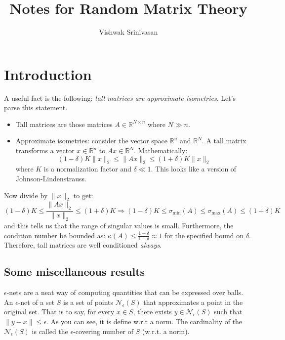 \documentclass{article}
\title{Notes for Random Matrix Theory}
\author{Vishwak Srinivasan}
\date{}
\theoremstyle{remark}
\newcommand{\real}{\mathbb{R}}
\newcommand{\calN}{\mathcal{N}}
\begin{document}
\raggedright

\maketitle
\tableofcontents

\newpage

\section{Introduction}
A useful fact is the following: \emph{tall matrices are approximate isometries}. Let's parse this statement.
\begin{itemize}
\item Tall matrices are those matrices \(A \in \real^{N \times n}\) where \(N \gg n\).
\item Approximate isometries: consider the vector space \(\real^{n}\) and \(\real^{N}\). A tall matrix transforms a vector \(x \in \real^{n}\) to \(Ax \in \real^{N}\). Mathematically:
\begin{equation*}
(1 - \delta)K\|x\|_{2} \leq \|Ax\|_{2} \leq (1 + \delta)K\|x\|_{2}
\end{equation*}
where \(K\) is a normalization factor and \(\delta \ll 1\).
This looks like a version of Johnson-Lindenstrauss.
\end{itemize}

Now divide by \(\|x\|_{2}\) to get:
\begin{equation*}
(1 - \delta)K \leq \frac{\|Ax\|_{2}}{\|x\|_{2}} \leq (1 + \delta)K \Rightarrow (1 - \delta)K \leq \sigma_{\min}(A) \leq \sigma_{\max}(A) \leq (1 + \delta)K
\end{equation*}
and this tells us that the range of singular values is small. Furthermore, the condition number be bounded as: \(\kappa(A) \leq \frac{1 + \delta}{1 - \delta} \approx 1\) for the specified bound on \(\delta\). Therefore, tall matrices are well conditioned \emph{always}.

\subsection{Some miscellaneous results}
\(\epsilon\)-nets are a neat way of computing quantities that can be expressed over balls.
An \(\epsilon\)-net of a set \(S\) is a set of points \(\calN_{\epsilon}(S)\) that approximates a point in the original set.
That is to say, for every \(x \in S\), there exists \(y \in \calN_{\epsilon}(S)\) such that \(\|y - x\| \leq \epsilon\).
As you can see, it is define w.r.t a norm. The cardinality of the \(\calN_{\epsilon}(S)\) is called the \(\epsilon\)-covering number of \(S\) (w.r.t. a norm).
\end{document}
